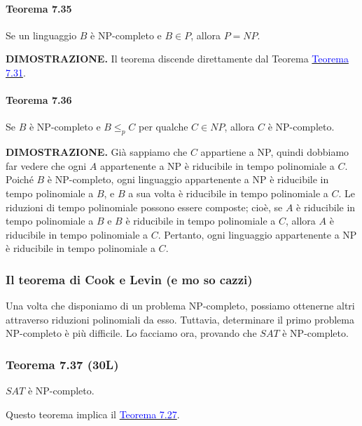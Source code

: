 \documentclass{article}
\begin{document}
\paragraph{Teorema 7.35}
\label{teorema-7.35}
\vspace{1em}
\text{}
\newline
Se un linguaggio $B$ è NP-completo e $B \in P$, allora $P = NP$.

\text{}
\newline
\textbf{DIMOSTRAZIONE.}
Il teorema discende direttamente dal Teorema \hyperref[teorema-7.31]{\textcolor{blue}{Teorema 7.31}}.

\paragraph{Teorema 7.36}
\label{teorema-7.36}
\vspace{1em}
\text{}
\newline
Se $B$ è NP-completo e $B \leq_p C$ per qualche $C \in NP$, allora $C$ è NP-completo.

\text{}
\newline
\textbf{DIMOSTRAZIONE.}
Già sappiamo che $C$ appartiene a NP, quindi dobbiamo far vedere che ogni $A$ appartenente a NP è riducibile in tempo polinomiale a $C$. 
Poiché $B$ è NP-completo, ogni linguaggio appartenente a NP è riducibile in tempo polinomiale a $B$, e $B$ a sua volta è riducibile in tempo polinomiale a $C$. 
Le riduzioni di tempo polinomiale possono essere composte; cioè, se $A$ è riducibile in tempo polinomiale a $B$ e $B$ è riducibile in tempo polinomiale a $C$, allora $A$ è riducibile in tempo polinomiale a $C$. 
Pertanto, ogni linguaggio appartenente a NP è riducibile in tempo polinomiale a $C$.

\subsubsection{Il teorema di Cook e Levin (e mo so cazzi)}
Una volta che disponiamo di un problema NP-completo, possiamo ottenerne altri attraverso riduzioni polinomiali da esso. 
Tuttavia, determinare il primo problema NP-completo è più difficile.
Lo facciamo ora, provando che $SAT$ è NP-completo.

\subsubsection*{Teorema 7.37 (30L)}
\label{teorema-7.37}
$SAT$ è NP-completo.

\text{}
\newline
Questo teorema implica il \hyperref[teorema-7.27]{\textcolor{blue}{Teorema 7.27}}.
\end{document}

